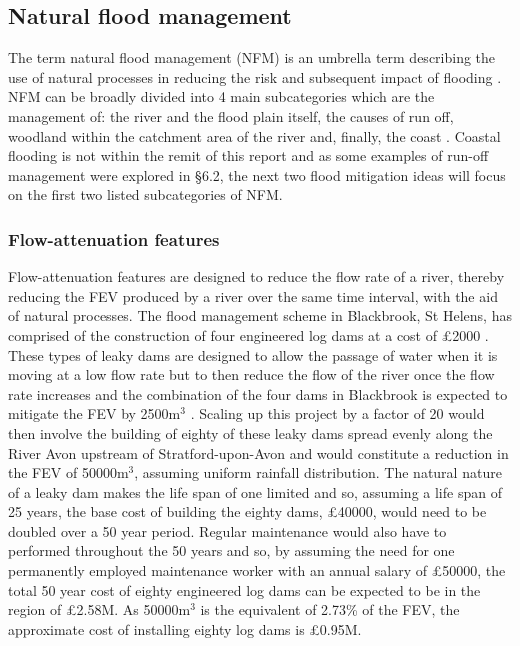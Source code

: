 \documentclass[11pt,a4paper]{article}
\begin{document}
\subsection{Natural flood management}
The term natural flood management (NFM) is an umbrella term describing the use of natural processes in reducing the risk and subsequent impact of flooding \cite{NFM}. NFM can be broadly divided into 4 main subcategories which are the management of: the river and the flood plain itself, the causes of run off, woodland within the catchment area of the river and, finally, the coast \cite{nfm}. Coastal flooding is not within the remit of this report and as some examples of run-off management were explored in \S 6.2, the next two flood mitigation ideas will focus on the first two listed subcategories of NFM.

\subsubsection{Flow-attenuation features}
Flow-attenuation features are designed to reduce the flow rate of a river, thereby reducing the FEV produced by a river over the same time interval, with the aid of natural processes. The flood management scheme in Blackbrook, St Helens, has comprised of the construction of four engineered log dams at a cost of \pounds2000 \cite{nfm}. These types of leaky dams are designed to allow the passage of water when it is moving at a low flow rate but to then reduce the flow of the river once the flow rate increases and the combination of the four dams in Blackbrook is expected to mitigate the FEV by 2500m$^3$ \cite{blackbrook}. Scaling up this project by a factor of 20 would then involve the building of eighty of these leaky dams spread evenly along the River Avon upstream of Stratford-upon-Avon and would constitute a reduction in the FEV of 50000m$^3$, assuming uniform rainfall distribution. The natural nature of a leaky dam makes the life span of one limited and so, assuming a life span of 25 years, the base cost of building the eighty dams, \pounds40000, would need to be doubled over a 50 year period. Regular maintenance would also have to performed throughout the 50 years and so, by assuming the need for one permanently employed maintenance worker with an annual salary of \pounds50000, the total 50 year cost of eighty engineered log dams can be expected to be in the region of \pounds2.58M. As 50000m$^3$ is the equivalent of 2.73\% of the FEV, the approximate cost of installing eighty log dams is \pounds0.95M.
\end{document}
